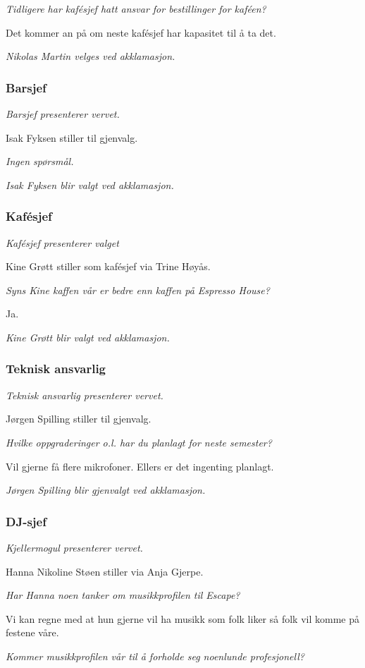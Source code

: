 \documentclass[10pt,norsk,a4paper]{article}
\begin{document}
\begin{minipage}[t]{0.49\textwidth}
\emph{Tidligere har kafésjef hatt ansvar for bestillinger for kaféen?}

Det kommer an på om neste kafésjef har kapasitet til å ta det.

\textit{Nikolas Martin velges ved akklamasjon.}
\subsubsection{Barsjef}
\textit{Barsjef presenterer vervet.}

Isak Fyksen stiller til gjenvalg.

\emph{Ingen spørsmål.}

\textit{Isak Fyksen blir valgt ved akklamasjon.}
\subsubsection{Kafésjef}
\textit{Kafésjef presenterer valget}

Kine Grøtt stiller som kafésjef via Trine Høyås.

\emph{Syns Kine kaffen vår er bedre enn kaffen på Espresso House?}

Ja.

\textit{Kine Grøtt blir valgt ved akklamasjon.}
\subsubsection{Teknisk ansvarlig}
\textit{Teknisk ansvarlig presenterer vervet.}

Jørgen Spilling stiller til gjenvalg.

\emph{Hvilke oppgraderinger o.l. har du planlagt for neste semester?}

Vil gjerne få flere mikrofoner. Ellers er det ingenting planlagt. 

\textit{Jørgen Spilling blir gjenvalgt ved akklamasjon.}
\subsubsection{DJ-sjef}
\textit{Kjellermogul presenterer vervet.}

Hanna Nikoline Støen stiller via Anja Gjerpe.

\emph{Har Hanna noen tanker om musikkprofilen til Escape?}

Vi kan regne med at hun gjerne vil ha musikk som folk liker så folk vil komme på festene våre.

\emph{Kommer musikkprofilen vår til å forholde seg noenlunde profesjonell?}


\end{minipage}
\end{document}
